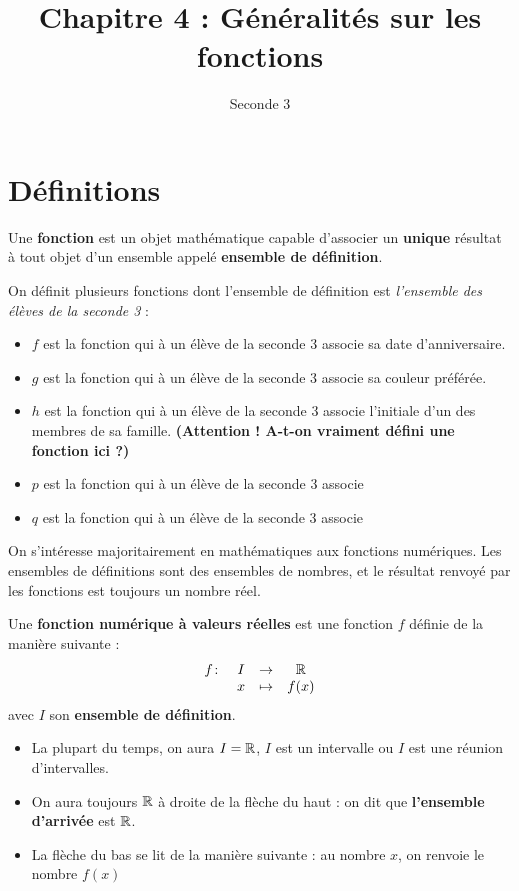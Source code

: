 \documentclass{poly}
\title{Chapitre 4 : Généralités sur les fonctions}
\author{Seconde 3}
\date{}
\begin{document}
\maketitle

\section{Définitions}
\begin{definition}
Une \textbf{fonction} est un objet mathématique capable d'associer un \textbf{unique} résultat à tout objet d'un ensemble appelé \textbf{ensemble de définition}. 
\end{definition}
\begin{example}
On définit plusieurs fonctions dont l'ensemble de définition est \emph{l'ensemble des élèves de la seconde 3} :
\begin{itemize}
\item $f$ est la fonction qui à un élève de la seconde 3 associe sa date d'anniversaire.
\item $g$ est la fonction qui à un élève de la seconde 3 associe sa couleur préférée.
\item $h$ est la fonction qui à un élève de la seconde 3 associe l'initiale d'un des membres de sa famille. \textbf{(Attention ! A-t-on vraiment défini une fonction ici ?)}
\item $p$ est la fonction qui à un élève de la seconde 3 associe 
\item $q$ est la fonction qui à un élève de la seconde 3 associe 
\end{itemize}
\end{example}
\begin{remark}
On s'intéresse majoritairement en mathématiques aux fonctions numériques. Les ensembles de définitions sont des ensembles de nombres, et le résultat renvoyé par les fonctions est toujours un nombre réel.
\end{remark}
\begin{definition}
Une \textbf{fonction numérique à valeurs réelles} est une fonction $f$ définie de la manière suivante :
\begin{equation*}
\begin{array}[t]{lccc} f \colon &I &\to& \mathbb{R}\\ & x &\mapsto& f(x)\end{array}
\end{equation*}
avec $I$ son \textbf{ensemble de définition}.
\end{definition}
\begin{remark}
\hfill
\begin{itemize}
\item La plupart du temps, on aura $I = \mathbb{R}$, $I$ est un intervalle ou $I$ est une réunion d'intervalles.
\item On aura toujours $\mathbb{R}$ à droite de la flèche du haut : on dit que \textbf{l'ensemble d'arrivée} est $\mathbb{R}$.
\item La flèche du bas se lit de la manière suivante : au nombre $x$, on renvoie le nombre $f(x)$
\end{itemize}
\end{remark}
\end{document}
